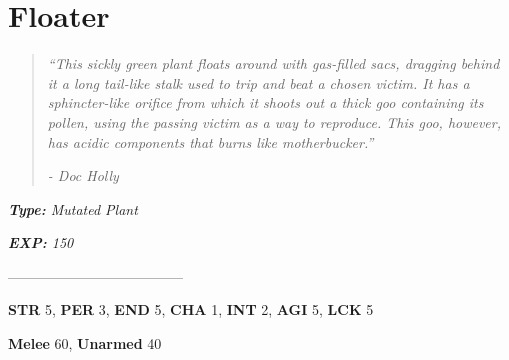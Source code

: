 \documentclass[11pt,a4paper,twocolumn]{book}
\begin{document}
	\section*{Floater}
	\begin{quote}
		\emph{``This sickly green plant floats around with gas-filled sacs, dragging behind it a long tail-like stalk used to trip and beat a chosen victim. It has a sphincter-like orifice from which it shoots out a thick goo containing its pollen, using the passing victim as a way to reproduce. This goo, however, has acidic components that burns like motherbucker.''}
		
		\emph{-	Doc Holly}
	\end{quote}
	
	\noindent
	\emph{\textbf{Type:} Mutated Plant}
	
	\noindent
	\emph{\textbf{EXP:} 150}
	
%		
%	
%		

	--------------------------------------

	\noindent
	\textbf{STR} 5, \textbf{PER} 3, \textbf{END} 5, \textbf{CHA} 1, \textbf{INT} 2, \textbf{AGI} 5, \textbf{LCK} 5
	
	\noindent
	\textbf{Melee} 60, \textbf{Unarmed} 40
	
\end{document}
